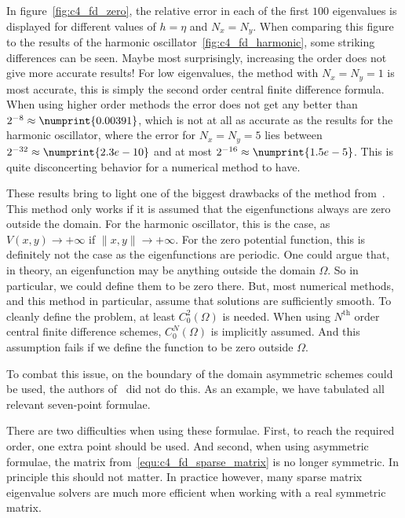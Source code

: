 In figure~\ref{fig:c4_fd_zero}, the relative error in each of the first $100$ eigenvalues is displayed for different values of $h = \eta$ and $N_x = N_y$. When comparing this figure to the results of the harmonic oscillator~\ref{fig:c4_fd_harmonic}, some striking differences can be seen. Maybe most surprisingly, increasing the order does not give more accurate results! For low eigenvalues, the method with $N_x=N_y=1$ is most accurate, this is simply the second order central finite difference formula. When using higher order methods the error does not get any better than $2^{-8}\approx \numprint{0.00391}$, which is not at all as accurate as the results for the harmonic oscillator, where the error for $N_x=N_y = 5$ lies between $2^{-32} \approx \numprint{2.3e-10}$ and at most $2^{-16} \approx \numprint{1.5e-5}$. This is quite disconcerting behavior for a numerical method to have.

These results bring to light one of the biggest drawbacks of the method from~\cite{wang_new_2009}. This method only works if it is assumed that the eigenfunctions always are zero outside the domain. For the harmonic oscillator, this is the case, as $V(x, y) \to +\infty$ if $\|x, y\| \to +\infty$. For the zero potential function, this is definitely not the case as the eigenfunctions are periodic. One could argue that, in theory, an eigenfunction may be anything outside the domain $\Omega$. So in particular, we could define them to be zero there. But, most numerical methods, and this method in particular, assume that solutions are sufficiently smooth. To cleanly define the problem, at least $C_0^2(\Omega)$ is needed. When using $N^\text{th}$ order central finite difference schemes, $C_0^{N}(\Omega)$ is implicitly assumed. And this assumption fails if we define the function to be zero outside $\Omega$.

To combat this issue, on the boundary of the domain asymmetric schemes could be used, the authors of~\cite{wang_new_2009} did not do this. As an example, we have tabulated all relevant seven-point formulae.
\begin{center}
    
\end{center}
There are two difficulties when using these formulae. First, to reach the required order, one extra point should be used. And second, when using asymmetric formulae, the matrix from~\eqref{equ:c4_fd_sparse_matrix} is no longer symmetric. In principle this should not matter. In practice however, many sparse matrix eigenvalue solvers are much more efficient when working with a real symmetric matrix.

